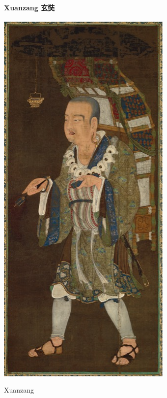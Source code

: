 \paragraph{Xuanzang 玄奘 }
\begin{marginfigure}
    \centering
    \includegraphics[width=\textwidth]{ConfucianismeTaoismeBouddhismeChinois/Images/Xuanzang.jpg}
    \caption{Xuanzang}
    \label{fig:enter-label}
\end{marginfigure}

